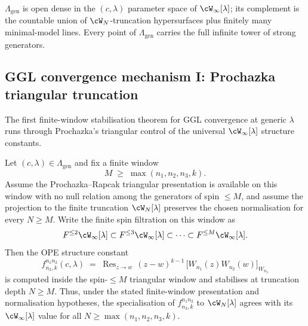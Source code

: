 \begin{remark}
\label{rem:generic-lambda-open-dense}
$\Lambda_{\mathrm{gen}}$ is open dense in the $(c, \lambda)$
parameter space of $\cW_\infty[\lambda]$; its complement is the
countable union of $\cW_N$-truncation hypersurfaces plus finitely
many minimal-model lines. Every point of $\Lambda_{\mathrm{gen}}$
carries the full infinite tower of strong generators.
\end{remark}

\subsection{GGL convergence mechanism I: Prochazka triangular truncation}
\label{subsec:ggl-mechanism-i-prochazka}

The first finite-window stabilisation theorem for GGL convergence
at generic $\lambda$ runs through Prochazka's triangular control of
the universal $\cW_\infty[\lambda]$ structure constants.

\begin{theorem}
\label{thm:ggl-convergence-prochazka}
Let $(c, \lambda) \in \Lambda_{\mathrm{gen}}$ and fix a finite window
\[
M \;\ge\; \max(n_1,n_2,n_3,k).
\]
Assume the Prochazka--Rapcak triangular presentation is available on
this window with no null relation among the generators of spin
\(\le M\), and assume the projection to the finite truncation
\(\cW_N[\lambda]\) preserves the chosen normalisation for every
\(N\ge M\). Write the finite spin filtration on this window as
\begin{equation}\label{eq:prochazka-filtration}
F^{\le 2}\cW_\infty[\lambda]\subset
F^{\le 3}\cW_\infty[\lambda]\subset\cdots\subset
F^{\le M}\cW_\infty[\lambda].
\end{equation}
Then the OPE structure constant
\begin{equation}\label{eq:structure-constant-f}
f^{n_1 n_2}_{n_3,k}(c, \lambda)
\;=\;
\operatorname{Res}_{z \to w}\, (z-w)^{k-1}\,
\bigl[ W_{n_1}(z) W_{n_2}(w)\bigr]_{W_{n_3}}
\end{equation}
is computed inside the spin-\(\le M\) triangular window and stabilises
at truncation depth \(N\ge M\). Thus, under the stated finite-window
presentation and normalisation hypotheses, the specialisation of
\(f^{n_1 n_2}_{n_3,k}\) to \(\cW_N[\lambda]\) agrees with its
\(\cW_\infty[\lambda]\) value for all
\(N \ge \max(n_1,n_2,n_3,k)\).
\end{theorem}

